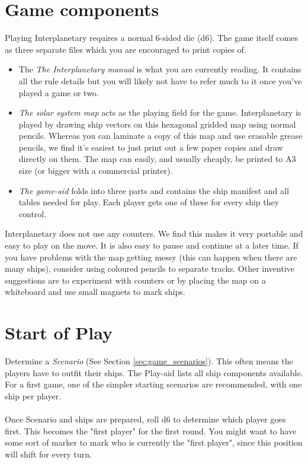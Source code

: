 \documentclass[a4paper,12pt,notitlepage,twocolumn]{article}
\begin{document}
\section{Game components}
Playing Interplanetary requires a normal 6-sided die (d6). The game itself comes as three 
separate files which you are encouraged to print copies of. 
\label{sec:game_components}
\begin{itemize}
\item The \emph{The Interplanetary manual} is what you are currently reading. It
  contains all the rule details but you will likely not have to refer
  much to it once you've played a game or two. 
\item \emph{The solar system map} acts as the playing
  field for the game. Interplanetary is played by drawing ship 
  vectors on this hexagonal gridded map using normal pencils. Whereas
  you can laminate a copy of this map and use erasable grease pencils,
  we find it's easiest to just print out a few paper copies and draw
  directly on them. The map can easily, and usually cheaply, be printed
  to A3 size (or bigger with a commercial printer).
\item  \emph{The game-aid} folds into three parts and contains the ship
  manifest and all tables needed for play. Each player gets one of
  these for every ship they control.  
\end{itemize} 
Interplanetary does not use any counters. We find this makes it very portable and
easy to play on the move. It is also easy to pause and continue at a
later time. If you have problems with the map getting messy (this can
happen when there are many ships), consider using coloured pencils to
separate tracks. Other inventive suggestions are to experiment with counters or
by placing the map on a whiteboard and use small magnets to mark ships.   

\section{Start of Play}

Determine a \emph{Scenario} (See Section \ref{sec:game_scenarios}). This 
often means the players have to outfit their ships. The Play-aid
lists all ship components available. For a first game, one of the simpler starting 
scenarios are recommended, with one ship per player.
\\\\
Once Scenario and ships are prepared, roll d6 to determine which player goes
first. This becomes the "first player" for the first round. You might want to 
have some sort of marker to mark who is currently the "first player", since this
position will shift for every turn. 
\end{document}

